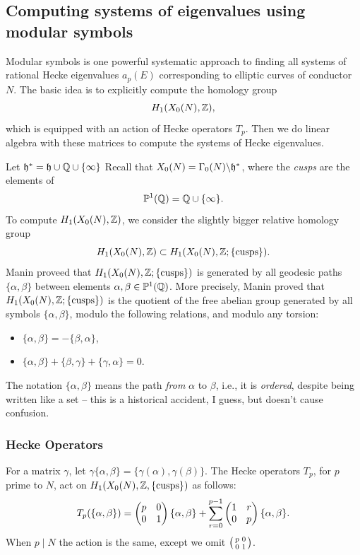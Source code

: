 \documentclass{book}
\begin{document}
\subsection{Computing systems of eigenvalues using modular symbols}
Modular symbols is one
powerful systematic approach to finding all systems
of rational Hecke eigenvalues $a_p(E)$ corresponding
to elliptic curves of conductor $N$.
The basic idea is to explicitly compute the homology group
$$
  H_1(X_0(N),\mathbb{Z}),
$$
which is equipped with an action of Hecke operators $T_p$.
Then we do linear algebra with these matrices
to compute the systems of Hecke eigenvalues.

Let $\mathfrak{h}^* = \mathfrak{h} \cup \mathbb{Q}\cup\{\infty\}$
Recall that $X_0(N)=\Gamma_0(N)\backslash \mathfrak{h}^*$,
where the {\em cusps} are the elements of
$$
\mathbb{P}^1(\mathbb{Q}) = \mathbb{Q} \cup\{\infty\}.
$$
To compute $H_1(X_0(N),\mathbb{Z})$, we consider the slightly
bigger relative homology group
$$
H_1(X_0(N),\mathbb{Z}) \subset H_1(X_0(N),\mathbb{Z}; \{\text{cusps}\}).
$$
Manin proveed that $H_1(X_0(N),\mathbb{Z}; \{\text{cusps}\})$ is
generated by all geodesic paths $\{\alpha,\beta\}$
between elements $\alpha,\beta \in \mathbb{P}^1(\mathbb{Q})$.  More precisely,
Manin proved that
$H_1(X_0(N),\mathbb{Z}; \{\text{cusps}\})$ is the quotient
of the free abelian group generated by all symbols
$\{\alpha,\beta\}$, modulo the following relations,
and modulo any torsion:
\begin{itemize}
\item $\{\alpha,\beta\} = -\{\beta,\alpha\}$,
\item $\{\alpha,\beta\} + \{\beta,\gamma\} + \{\gamma,\alpha\} = 0$.
\end{itemize}


\begin{remark}
The notation $\{\alpha,\beta\}$ means the path {\em from}
$\alpha$ to $\beta$, i.e., it is {\em ordered}, despite
being written
like a set -- this is a historical accident, I guess,
but doesn't cause confusion.
\end{remark}



\subsubsection{Hecke Operators}

For a matrix $\gamma$, let $\gamma\{\alpha,\beta\} =
\{\gamma(\alpha),\gamma(\beta)\}$.
The Hecke operators $T_p$, for $p$ prime to $N$, act on $H_1(X_0(N),\mathbb{Z},\{\text{cusps}\})$
as follows:
$$
T_p(\{\alpha,\beta\})
 = \left( \begin{matrix}p&0\\0&1 \end{matrix}\right)\{\alpha, \beta\}
   + \sum_{r=0}^{p-1} \left( \begin{matrix}1&r\\0&p \end{matrix}\right)\{\alpha,\beta\}.
$$
When $p\mid N$ the action is the same, except we
omit $\left( \begin{smallmatrix}p&0\\0&1\end{smallmatrix}\right)$.
\end{document}

